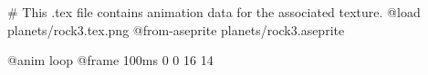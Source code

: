 # This .tex file contains animation data for the associated texture.
@load planets/rock3.tex.png
@from-aseprite planets/rock3.aseprite

@anim loop
	@frame 100ms 0 0 16 14
